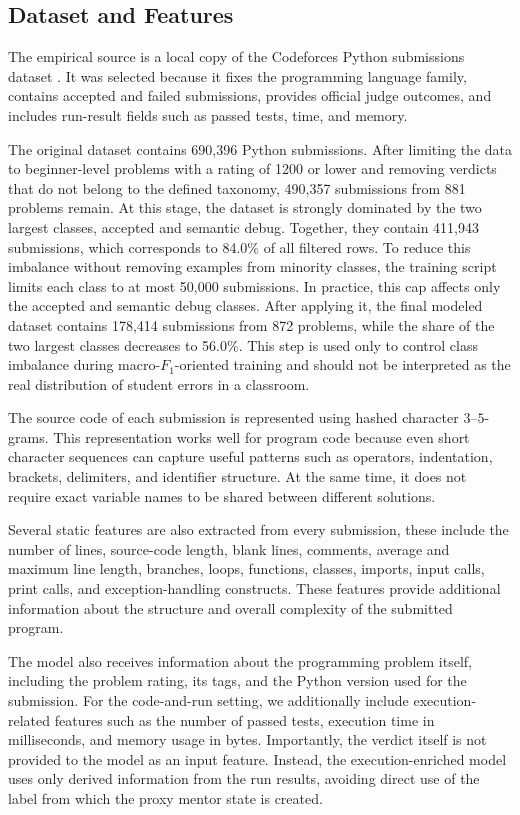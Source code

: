 \documentclass[conference]{IEEEtran}
\begin{document}
\subsection{Dataset and Features}

The empirical source is a local copy of the Codeforces Python submissions dataset \cite{MatrixStudio2026}. It was selected because it fixes the programming language family, contains accepted and failed submissions, provides official judge outcomes, and includes run-result fields such as passed tests, time, and memory.

The original dataset contains 690,396 Python submissions. After limiting the data to beginner-level problems with a rating of 1200 or lower and removing verdicts that do not belong to the defined taxonomy, 490,357 submissions from 881 problems remain. At this stage, the dataset is strongly dominated by the two largest classes, accepted and semantic debug. Together, they contain 411,943 submissions, which corresponds to 84.0\% of all filtered rows. To reduce this imbalance without removing examples from minority classes, the training script limits each class to at most 50,000 submissions. In practice, this cap affects only the accepted and semantic debug classes. After applying it, the final modeled dataset contains 178,414 submissions from 872 problems, while the share of the two largest classes decreases to 56.0\%. This step is used only to control class imbalance during macro-$F_1$-oriented training and should not be interpreted as the real distribution of student errors in a classroom.

The source code of each submission is represented using hashed character $3$--$5$-grams. This representation works well for program code because even short character sequences can capture useful patterns such as operators, indentation, brackets, delimiters, and identifier structure. At the same time, it does not require exact variable names to be shared between different solutions.

Several static features are also extracted from every submission, these include the number of lines, source-code length, blank lines, comments, average and maximum line length, branches, loops, functions, classes, imports, input calls, print calls, and exception-handling constructs. These features provide additional information about the structure and overall complexity of the submitted program.

The model also receives information about the programming problem itself, including the problem rating, its tags, and the Python version used for the submission. For the code-and-run setting, we additionally include execution-related features such as the number of passed tests, execution time in milliseconds, and memory usage in bytes. Importantly, the verdict itself is not provided to the model as an input feature. Instead, the execution-enriched model uses only derived information from the run results, avoiding direct use of the label from which the proxy mentor state is created.
\end{document}
